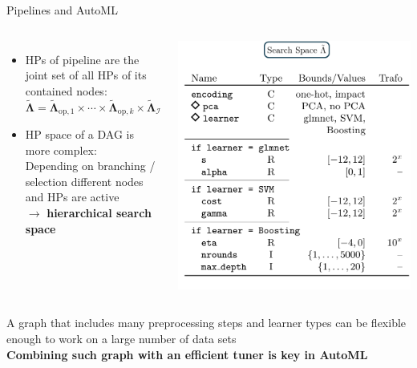 \begin{vbframe}{Pipelines and AutoML}
\begin{columns}
\begin{itemize}
    \item HPs of pipeline are the joint set of all HPs of its contained nodes:\\
    $\tilde{\bm\Lambda}=\tilde{\bm\Lambda}_{\mathrm{op}, 1} \times \cdots \times \tilde{\bm\Lambda}_{\mathrm{op}, k} \times \tilde{\bm\Lambda}_{\mathcal{I}}$
    \item HP space of a DAG is more complex:\\
    Depending on branching / selection different nodes and HPs are active\\ $\rightarrow$ \textbf{hierarchical search space}
\end{itemize}
\begin{center}
\includegraphics[width = \textwidth]{figure_man/pipeline_with_param_table_II.png}
\end{center}
\end{columns}%
\vspace{1em}

A graph that includes many preprocessing steps and learner types can be flexible enough to work on a large number of data sets\\
\vspace{1em}
\textbf{Combining such graph with an efficient tuner is key in AutoML}
\end{vbframe}



